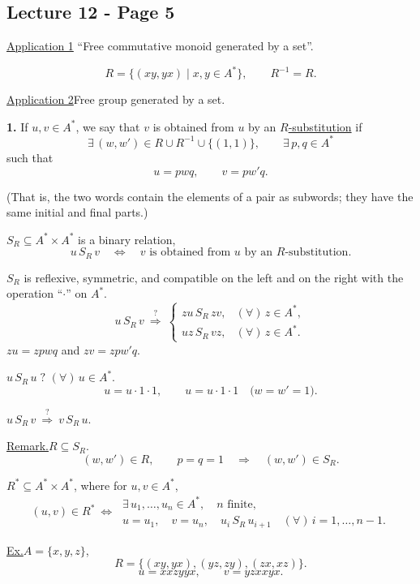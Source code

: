 
\subsection*{Lecture 12 - Page 5}

\noindent\underline{Application 1}\quad
``Free commutative monoid generated by a set''.

\[
R=\bigl\{(xy,yx)\mid x,y\in A^*\bigr\},\qquad R^{-1}=R.
\]

\medskip
\noindent\underline{Application 2}\quad Free group generated by a set.

\bigskip
\noindent\textbf{1.} If $u,v\in A^*$, we say that $v$ is obtained
 from $u$ by an \underline{$R$-substitution} if
\[
\exists\,(w,w')\in R\cup R^{-1}\cup\{(1,1)\},
\qquad \exists\,p,q\in A^*
\]
\noindent such that
\[
u=pwq,\qquad v=pw'q.
\]

\noindent (That is, the two words contain the elements of a pair as subwords;
 they have the same initial and final parts.)

\bigskip
\noindent $S_R\subseteq A^*\times A^*$ is a binary relation,
\[
u\,S_R\,v\quad\Longleftrightarrow\quad
v\text{ is obtained from }u\text{ by an }R\text{-substitution}.
\]

\noindent $S_R$ is reflexive, symmetric, and compatible on the left
 and on the right with the operation ``$\cdot$'' on $A^*$.
\[
u\,S_R\,v\ \overset{?}{\Longrightarrow}\
\begin{cases}
zu\,S_R\,zv, & (\forall)\,z\in A^*,\\
uz\,S_R\,vz, & (\forall)\,z\in A^*.
\end{cases}
\]
\noindent $zu=zpwq$ and $zv=zpw'q$.

\medskip
\noindent $u\,S_R\,u\;?$ \quad $(\forall)\,u\in A^*$.
\[
u=u\cdot1\cdot1,\qquad u=u\cdot1\cdot1
\quad\bigl(w=w'=1\bigr).
\]

\noindent $u\,S_R\,v\ \overset{?}{\Longrightarrow}\ v\,S_R\,u$.

\bigskip
\noindent\underline{Remark.}\quad $R\subseteq S_R$.
\[
(w,w')\in R,\qquad p=q=1
\quad\Longrightarrow\quad (w,w')\in S_R.
\]

\bigskip
\noindent $R^*\subseteq A^*\times A^*$, where for $u,v\in A^*$,
\[
(u,v)\in R^*\ \Longleftrightarrow\
\begin{gathered}
\exists\,u_1,\ldots,u_n\in A^*,\quad n\text{ finite},\\
u=u_1,\quad v=u_n,\quad
u_i\,S_R\,u_{i+1}\quad (\forall)\,i=1,\ldots,n-1.
\end{gathered}
\]

\bigskip
\noindent\underline{Ex.}\quad $A=\{x,y,z\}$,
\[
R=\bigl\{(xy,yx),(yz,zy),(zx,xz)\bigr\}.
\]
\[
u=xxzyyx,\qquad v=yzxxyx.
\]
